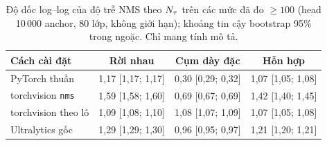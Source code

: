 \begin{table}[t]
\centering\small
\caption{Độ dốc log--log của độ trễ NMS theo $N_{\tau}$ trên các mức đã đo $\ge 100$ (head 10\,000 anchor, 80 lớp, không giới hạn); khoảng tin cậy bootstrap 95\% trong ngoặc. Chỉ mang tính mô tả.}
\label{tab:slopes}
\begin{tabular}{@{}lccc@{}}
\toprule
Cách cài đặt & Rời nhau & Cụm dày đặc & Hỗn hợp \\
\midrule
PyTorch thuần & 1,17 [1,17; 1,17] & 0,30 [0,29; 0,32] & 1,07 [1,05; 1,08] \\
torchvision \texttt{nms} & 1,59 [1,58; 1,60] & 0,69 [0,67; 0,69] & 1,42 [1,40; 1,45] \\
torchvision theo lô & 1,09 [1,08; 1,10] & 1,08 [1,07; 1,09] & 1,07 [1,05; 1,08] \\
Ultralytics gốc & 1,29 [1,29; 1,30] & 0,96 [0,95; 0,97] & 1,21 [1,20; 1,21] \\
\bottomrule
\end{tabular}
\end{table}
